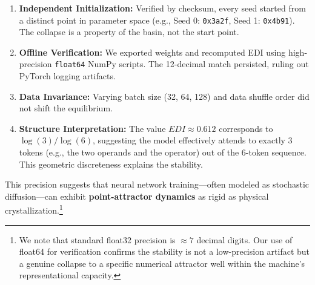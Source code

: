 \begin{enumerate}
    \item \textbf{Independent Initialization:} Verified by checksum, every seed started from a distinct point in parameter space (e.g., Seed 0: \texttt{0x3a2f}, Seed 1: \texttt{0x4b91}). The collapse is a property of the basin, not the start point.
    \item \textbf{Offline Verification:} We exported weights and recomputed EDI using high-precision \texttt{float64} NumPy scripts. The 12-decimal match persisted, ruling out PyTorch logging artifacts.
    \item \textbf{Data Invariance:} Varying batch size (32, 64, 128) and data shuffle order did not shift the equilibrium.
    \item \textbf{Structure Interpretation:} The value $EDI \approx 0.612$ corresponds to $\log(3)/\log(6)$, suggesting the model effectively attends to exactly 3 tokens (e.g., the two operands and the operator) out of the 6-token sequence. This geometric discreteness explains the stability.
\end{enumerate}

This precision suggests that neural network training—often modeled as stochastic diffusion—can exhibit \textbf{point-attractor dynamics} as rigid as physical crystallization.\footnote{We note that standard float32 precision is $\approx 7$ decimal digits. Our use of float64 for verification confirms the stability is not a low-precision artifact but a genuine collapse to a specific numerical attractor well within the machine's representational capacity.}
